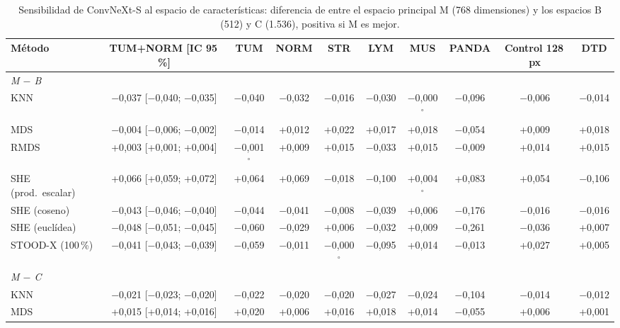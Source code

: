 \begin{table}
\centering
\scriptsize
\setlength{\tabcolsep}{2pt}
\caption{Sensibilidad de ConvNeXt-S al espacio de características: diferencia de \AUROC entre el espacio principal M (768 dimensiones) y los espacios B (512) y C (1.536), positiva si M es mejor.}
\label{tab:convnext-sensibilidad}
\begin{tabular*}{\linewidth}{@{\extracolsep{\fill}}lccccccccc}
\toprule
Método & TUM+NORM [IC 95\,\%] & TUM & NORM & STR & LYM & MUS & PANDA & Control 128\,px & DTD \\
\midrule
\multicolumn{10}{l}{\textit{M $-$ B}} \\
KNN & $-$0{,}037 [$-$0{,}040; $-$0{,}035] & $-$0{,}040 & $-$0{,}032 & $-$0{,}016 & $-$0{,}030 & $-$0{,}000$^{\circ}$ & $-$0{,}096 & $-$0{,}006 & $-$0{,}014 \\
MDS & $-$0{,}004 [$-$0{,}006; $-$0{,}002] & $-$0{,}014 & +0{,}012 & +0{,}022 & +0{,}017 & +0{,}018 & $-$0{,}054 & +0{,}009 & +0{,}018 \\
RMDS & +0{,}003 [+0{,}001; +0{,}004] & $-$0{,}001$^{\circ}$ & +0{,}009 & +0{,}015 & $-$0{,}033 & +0{,}015 & $-$0{,}009 & +0{,}014 & +0{,}015 \\
SHE (prod.\ escalar) & +0{,}066 [+0{,}059; +0{,}072] & +0{,}064 & +0{,}069 & $-$0{,}018 & $-$0{,}100 & +0{,}004$^{\circ}$ & +0{,}083 & +0{,}054 & $-$0{,}106 \\
SHE (coseno) & $-$0{,}043 [$-$0{,}046; $-$0{,}040] & $-$0{,}044 & $-$0{,}041 & $-$0{,}008 & $-$0{,}039 & +0{,}006 & $-$0{,}176 & $-$0{,}016 & $-$0{,}016 \\
SHE (euclídea) & $-$0{,}048 [$-$0{,}051; $-$0{,}045] & $-$0{,}060 & $-$0{,}029 & +0{,}006 & $-$0{,}032 & +0{,}009 & $-$0{,}261 & $-$0{,}036 & +0{,}007 \\
STOOD-X (100\,\%) & $-$0{,}041 [$-$0{,}043; $-$0{,}039] & $-$0{,}059 & $-$0{,}011 & $-$0{,}000$^{\circ}$ & $-$0{,}095 & +0{,}014 & $-$0{,}013 & +0{,}027 & +0{,}005 \\
\midrule
\multicolumn{10}{l}{\textit{M $-$ C}} \\
KNN & $-$0{,}021 [$-$0{,}023; $-$0{,}020] & $-$0{,}022 & $-$0{,}020 & $-$0{,}020 & $-$0{,}027 & $-$0{,}024 & $-$0{,}104 & $-$0{,}014 & $-$0{,}012 \\
MDS & +0{,}015 [+0{,}014; +0{,}016] & +0{,}020 & +0{,}006 & +0{,}016 & +0{,}018 & +0{,}014 & $-$0{,}055 & +0{,}006 & +0{,}001 \\

\end{tabular*}
\end{table}
